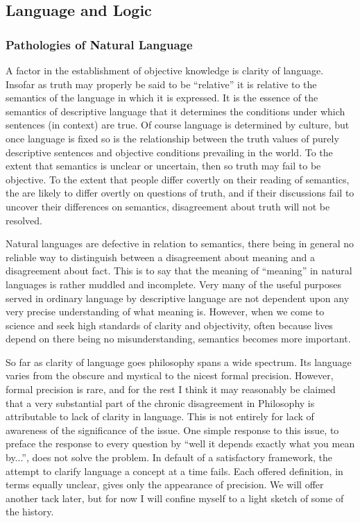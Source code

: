 \subsection{Language and Logic}

\subsubsection{Pathologies of Natural Language}

A factor in the establishment of objective knowledge is clarity of language.
Insofar as truth may properly be said to be ``relative'' it is relative to the semantics of the language in which it is expressed.
It is the essence of the semantics of descriptive language that it determines the conditions under which sentences (in context) are true.
Of course language is determined by culture, but once language is fixed so is the relationship between the truth values of purely descriptive sentences and objective conditions prevailing in the world. 
To the extent that semantics is unclear or uncertain, then so truth may fail to be objective.
To the extent that people differ covertly on their reading of semantics, the are likely to differ overtly on questions of truth, and if their discussions fail to uncover their differences on semantics, disagreement about truth will not be resolved.

Natural languages are defective in relation to semantics, there being in general no reliable way to distinguish between a disagreement about meaning and a disagreement about fact.
This is to say that the meaning of ``meaning'' in natural languages is rather muddled and incomplete.
Very many of the useful purposes served in ordinary language by descriptive language are not dependent upon any very precise understanding of what meaning is.
However, when we come to science and seek high standards of clarity and objectivity, often because lives depend on there being no misunderstanding, semantics becomes more important.

So far as clarity of language goes philosophy spans a wide spectrum.
Its language varies from the obscure and mystical to the nicest formal precision.
However, formal precision is rare, and for the rest I think it may reasonably be claimed that a very substantial part of the chronic disagreement in Philosophy is attributable to lack of clarity in language.
This is not entirely for lack of awareness of the significance of the issue.
One simple response to this issue, to preface the response to every question by ``well it depends exactly what you mean by...'', does not solve the problem.
In default of a satisfactory framework, the attempt to clarify language a concept at a time fails.
Each offered definition, in terms equally unclear, gives only the appearance of precision.
We will offer another tack later, but for now I will confine myself to a light sketch of some of the history.


